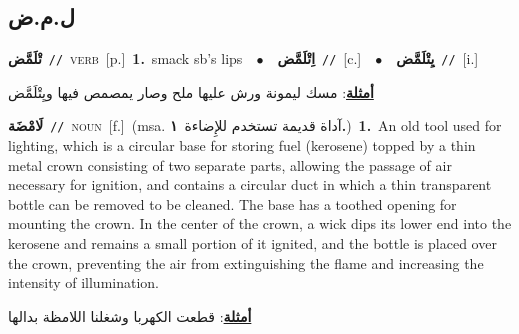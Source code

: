 \documentclass[10pt,a4paper,twoside]{article} %
\begin{document}
\begin{multicols}{2}
\vspace{-3mm}
\subsection*{\color{blue}\foreignlanguage{arabic}{ل.م.ض}\color{blue}{}} 

{\setlength\topsep{0pt}\textbf{\foreignlanguage{arabic}{تْلَمَّض}}\ {\color{gray}\texttt{//}\color{black}}\ \textsc{verb}\ [p.]\ \textbf{1.}~smack sb's lips\ \ $\bullet$\ \ \setlength\topsep{0pt}\textbf{\foreignlanguage{arabic}{اِتْلَمَّض}}\ {\color{gray}\texttt{//}\color{black}}\ [c.]\ \ $\bullet$\ \ \setlength\topsep{0pt}\textbf{\foreignlanguage{arabic}{يِتْلَمَّض}}\ {\color{gray}\texttt{//}\color{black}}\ [i.]\  \begin{flushright}\color{gray}\foreignlanguage{arabic}{\textbf{\underline{\foreignlanguage{arabic}{أمثلة}}}: مسك ليمونة ورش عليها ملح وصار يمصمص فيها ويِتْلَمَّض}\end{flushright}\color{black}} \vspace{2mm}

{\setlength\topsep{0pt}\textbf{\foreignlanguage{arabic}{لَامْضَة}}\ {\color{gray}\texttt{//}\color{black}}\ \textsc{noun}\ [f.]\ \color{gray}(msa. \foreignlanguage{arabic}{آداة قديمة تستخدم للإِضاءة}~\foreignlanguage{arabic}{\textbf{١.}})\color{black}\ \textbf{1.}~An old tool used for lighting, which is a circular base for storing fuel (kerosene) topped by a thin metal crown consisting of two separate parts, allowing the passage of air necessary for ignition, and contains a circular duct in which a thin transparent bottle can be removed to be cleaned. The base has a toothed opening for mounting the crown. In the center of the crown, a wick dips its lower end into the kerosene and remains a small portion of it ignited, and the bottle is placed over the crown, preventing the air from extinguishing the flame and increasing the intensity of illumination.\  \begin{flushright}\color{gray}\foreignlanguage{arabic}{\textbf{\underline{\foreignlanguage{arabic}{أمثلة}}}: قطعت الكهربا وشغلنا اللامظة بدالها}\end{flushright}\color{black}} \vspace{2mm}


\end{multicols}
\end{document}
